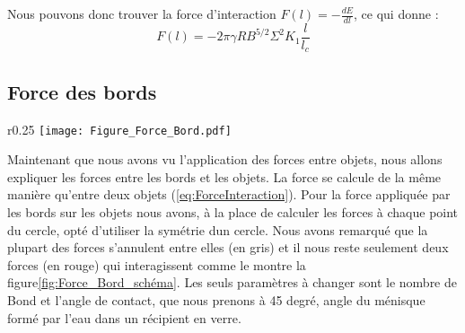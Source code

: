         Nous pouvons donc trouver la force d'interaction $F(l)=-\frac{dE}{dl}$, ce qui donne :
        \begin{equation}
            \boxed{
                F(l)=-2\pi\gamma RB^{5/2}\Sigma^2K_1\frac{l}{l_c}
            }
            \label{eq:ForceInteraction}
        \end{equation}



        \subsection{Force des bords}
            \begin{wrapfigure}{r}{0.25\textwidth}
            \centering
                \texttt{[image: Figure\_Force\_Bord.pdf]}
                \caption{Schéma des forces des bords.}
                \label{fig:Force_Bord_schéma}
            \end{wrapfigure}
            Maintenant que nous avons vu l'application des forces entre objets, nous allons expliquer les forces entre les bords et les objets. La force se calcule de la même manière qu'entre deux objets (\ref{eq:ForceInteraction}). Pour la force appliquée par les bords sur les objets nous avons, à la place de calculer les forces à chaque point du cercle, opté d'utiliser la symétrie dun cercle. Nous avons remarqué que la plupart des forces s'annulent entre elles (en gris) et il nous reste seulement deux forces (en rouge) qui interagissent comme le montre la figure\ref{fig:Force_Bord_schéma}. Les seuls paramètres à changer sont le nombre de Bond et l'angle de contact, que nous prenons à 45 degré, angle du ménisque formé par l'eau dans un récipient en verre. 

